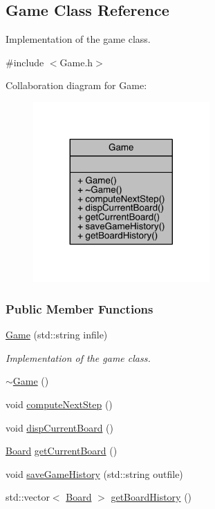 \hypertarget{a00030}{}\subsection{Game Class Reference}
\label{a00030}


Implementation of the game class.  




{\ttfamily \#include $<$Game.\+h$>$}



Collaboration diagram for Game\+:\nopagebreak
\begin{figure}[H]
\begin{center}
\leavevmode
\includegraphics[width=191pt]{a00165}
\end{center}
\end{figure}
\subsubsection*{Public Member Functions}
\begin{DoxyCompactItemize}
\item 
\hyperlink{a00030_a3bf173f99f6d593e04918d0f036c7bff}{Game} (std\+::string infile)
\begin{DoxyCompactList}\small\item\em Implementation of the game class. \end{DoxyCompactList}\item 
\hyperlink{a00030_ae3d112ca6e0e55150d2fdbc704474530}{$\sim$\+Game} ()
\item 
void \hyperlink{a00030_ae3e272f1096346f3a92cdacbaa0a42e3}{compute\+Next\+Step} ()
\item 
void \hyperlink{a00030_aa4187ecbc12539c404dfad4341f7af3a}{disp\+Current\+Board} ()
\item 
\hyperlink{a00009}{Board} \hyperlink{a00030_a29671bb1df74ec1a6f88df789c76e8d7}{get\+Current\+Board} ()
\item 
void \hyperlink{a00030_a2f5e0edfe4122b7619ef39ca0a1abad4}{save\+Game\+History} (std\+::string outfile)
\item 
std\+::vector$<$ \hyperlink{a00009}{Board} $>$ \hyperlink{a00030_a760c155e458c800e3c8dbc5f292270d6}{get\+Board\+History} ()
\end{DoxyCompactItemize}


